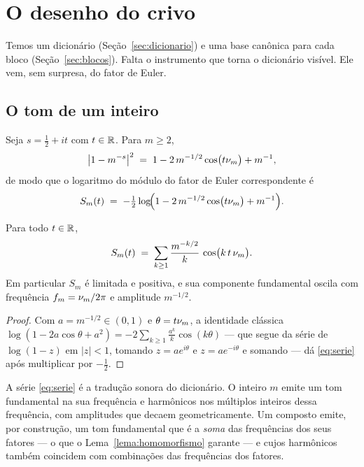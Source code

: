\section{O desenho do crivo}\label{sec:desenho}

Temos um dicionário (Seção~\ref{sec:dicionario}) e uma base canônica para cada
bloco (Seção~\ref{sec:blocos}). Falta o instrumento que torna o dicionário
visível. Ele vem, sem surpresa, do fator de Euler.

\subsection{O tom de um inteiro}

Seja $s=\tfrac12+it$ com $t\in\mathbb{R}$. Para $m\ge2$,
\[
  \bigl|1-m^{-s}\bigr|^2
  \;=\; 1-2\,m^{-1/2}\cos\bigl(t\nu_{m}\bigr)+m^{-1},
\]
de modo que o logaritmo do módulo do fator de Euler correspondente é
\begin{equation}\label{eq:Sm}
  S_m(t) \;=\; -\tfrac12\log\!\Bigl(1-2\,m^{-1/2}\cos\bigl(t\nu_{m}\bigr)+m^{-1}\Bigr).
\end{equation}

\begin{lema}\label{lema:serie}
Para todo $t\in\mathbb{R}$,
\begin{equation}\label{eq:serie}
  S_m(t) \;=\; \sum_{k\ge1}\frac{m^{-k/2}}{k}\,\cos\bigl(k\,t\,\nu_{m}\bigr).
\end{equation}
Em particular $S_m$ é limitada e positiva, e sua componente fundamental oscila
com frequência $f_{m}=\nu_{m}/2\pi$ e amplitude $m^{-1/2}$.
\end{lema}

\begin{proof}
Com $a=m^{-1/2}\in(0,1)$ e $\theta=t\nu_{m}$, a identidade clássica
$\log(1-2a\cos\theta+a^2)=-2\sum_{k\ge1}\frac{a^k}{k}\cos(k\theta)$ — que segue da
série de $\log(1-z)$ em $|z|<1$, tomando $z=ae^{i\theta}$ e $z=ae^{-i\theta}$ e
somando — dá \eqref{eq:serie} após multiplicar por $-\tfrac12$.
\end{proof}

A série \eqref{eq:serie} é a tradução sonora do dicionário. O inteiro $m$ emite um
tom fundamental na sua frequência e harmônicos nos múltiplos inteiros dessa
frequência, com amplitudes que decaem geometricamente. Um composto emite, por
construção, um tom fundamental que é a \emph{soma} das frequências dos seus
fatores — o que o Lema~\ref{lema:homomorfismo} garante — e cujos harmônicos também
coincidem com combinações das frequências dos fatores.

